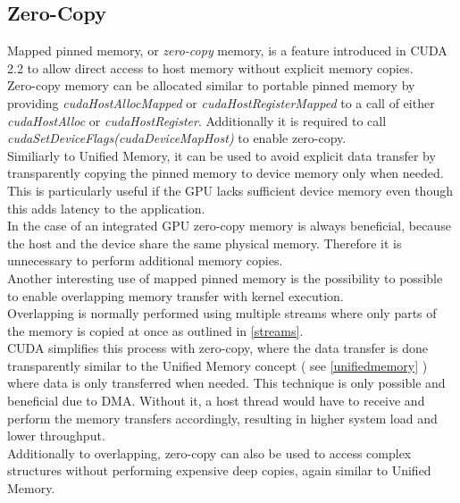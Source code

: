 \subsection{Zero-Copy}
\label{zerocopy}
Mapped pinned memory, or \emph{zero-copy} memory, is a feature introduced in CUDA 2.2\cite{doc_cuda22_pinnedmem} to allow direct access to host memory without explicit memory copies.\\
Zero-copy memory can be allocated similar to portable pinned memory by providing \emph{cudaHostAllocMapped} or \emph{cudaHostRegisterMapped} to a call of either \emph{cudaHostAlloc} or \emph{cudaHostRegister}.
Additionally it is required to call \emph{cudaSetDeviceFlags(cudaDeviceMapHost)} to enable zero-copy.\\
Similiarly to Unified Memory, it can be used to avoid explicit data transfer by transparently copying the pinned memory to device memory only when needed.\\
This is particularly useful if the GPU lacks sufficient device memory even though this adds latency to the application.\\
In the case of an integrated GPU zero-copy memory is always beneficial, because the host and the device share the same physical memory. Therefore it is unnecessary to perform additional memory copies.\\
Another interesting use of mapped pinned memory is the possibility to possible to enable overlapping memory transfer with kernel execution.\\
Overlapping is normally performed using multiple streams where only parts of the memory is copied at once as outlined in \ref{streams}.\\
CUDA simplifies this process with zero-copy, where the data transfer is done transparently similar to the Unified Memory concept ( see \ref{unifiedmemory} ) where data is only transferred when needed.
This technique is only possible and beneficial due to DMA. Without it, a host thread would have to receive and perform the memory transfers accordingly, resulting in higher system load and lower throughput.\\
Additionally to overlapping, zero-copy can also be used to access complex structures without performing expensive deep copies, again similar to Unified Memory.\\
